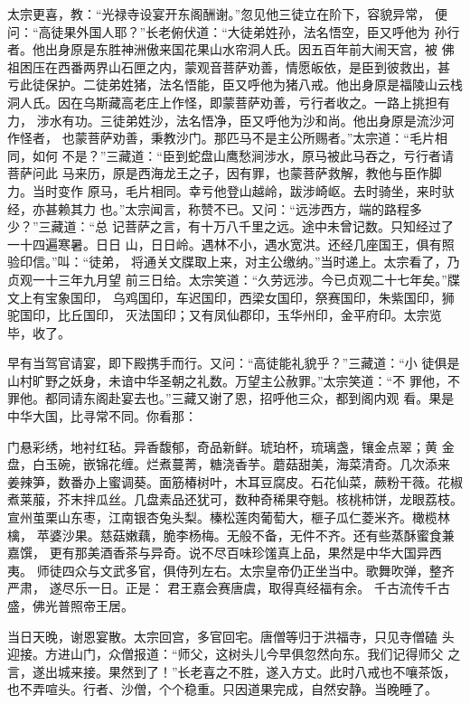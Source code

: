 太宗更喜，教：“光禄寺设宴开东阁酬谢。”忽见他三徒立在阶下，容貌异常，
便问：“高徒果外国人耶？”长老俯伏道：“大徒弟姓孙，法名悟空，臣又呼他为
孙行者。他出身原是东胜神洲傲来国花果山水帘洞人氏。因五百年前大闹天宫，被
佛祖困压在西番两界山石匣之内，蒙观音菩萨劝善，情愿皈依，是臣到彼救出，甚
亏此徒保护。二徒弟姓猪，法名悟能，臣又呼他为猪八戒。他出身原是福陵山云栈
洞人氏。因在乌斯藏高老庄上作怪，即蒙菩萨劝善，亏行者收之。一路上挑担有力，
涉水有功。三徒弟姓沙，法名悟净，臣又呼他为沙和尚。他出身原是流沙河作怪者，
也蒙菩萨劝善，秉教沙门。那匹马不是主公所赐者。”太宗道：“毛片相同，如何
不是？”三藏道：“臣到蛇盘山鹰愁涧涉水，原马被此马吞之，亏行者请菩萨问此
马来历，原是西海龙王之子，因有罪，也蒙菩萨救解，教他与臣作脚力。当时变作
原马，毛片相同。幸亏他登山越岭，跋涉崎岖。去时骑坐，来时驮经，亦甚赖其力
也。”太宗闻言，称赞不已。又问：“远涉西方，端的路程多少？”三藏道：“总
记菩萨之言，有十万八千里之远。途中未曾记数。只知经过了一十四遍寒暑。日日
山，日日岭。遇林不小，遇水宽洪。还经几座国王，俱有照验印信。”叫：“徒弟，
将通关文牒取上来，对主公缴纳。”当时递上。太宗看了，乃贞观一十三年九月望
前三日给。太宗笑道：“久劳远涉。今已贞观二十七年矣。”牒文上有宝象国印，
乌鸡国印，车迟国印，西梁女国印，祭赛国印，朱紫国印，狮驼国印，比丘国印，
灭法国印；又有凤仙郡印，玉华州印，金平府印。太宗览毕，收了。

早有当驾官请宴，即下殿携手而行。又问：“高徒能礼貌乎？”三藏道：“小
徒俱是山村旷野之妖身，未谙中华圣朝之礼数。万望主公赦罪。”太宗笑道：“不
罪他，不罪他。都同请东阁赴宴去也。”三藏又谢了恩，招呼他三众，都到阁内观
看。果是中华大国，比寻常不同。你看那：

门悬彩绣，地衬红毡。异香馥郁，奇品新鲜。琥珀杯，琉璃盏，镶金点翠；黄
金盘，白玉碗，嵌锦花缠。烂煮蔓菁，糖浇香芋。蘑菇甜美，海菜清奇。几次添来
姜辣笋，数番办上蜜调葵。面筋椿树叶，木耳豆腐皮。石花仙菜，蕨粉干薇。花椒
煮莱菔，芥末拌瓜丝。几盘素品还犹可，数种奇稀果夺魁。核桃柿饼，龙眼荔枝。
宣州茧栗山东枣，江南银杏兔头梨。榛松莲肉葡萄大，榧子瓜仁菱米齐。橄榄林檎，
苹婆沙果。慈菇嫩藕，脆李杨梅。无般不备，无件不齐。还有些蒸酥蜜食兼嘉馔，
更有那美酒香茶与异奇。说不尽百味珍馐真上品，果然是中华大国异西夷。
师徒四众与文武多官，俱侍列左右。太宗皇帝仍正坐当中。歌舞吹弹，整齐严肃，
遂尽乐一日。正是：
君王嘉会赛唐虞，取得真经福有余。
千古流传千古盛，佛光普照帝王居。

当日天晚，谢恩宴散。太宗回宫，多官回宅。唐僧等归于洪福寺，只见寺僧磕
头迎接。方进山门，众僧报道：“师父，这树头儿今早俱忽然向东。我们记得师父
之言，遂出城来接。果然到了！”长老喜之不胜，遂入方丈。此时八戒也不嚷茶饭，
也不弄喧头。行者、沙僧，个个稳重。只因道果完成，自然安静。当晚睡了。

